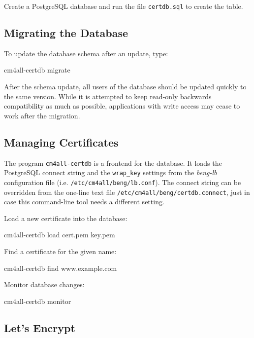 \documentclass[a4paper,12pt]{article}
\begin{document}
Create a PostgreSQL database and run the file \texttt{certdb.sql} to
create the table.

\subsection{Migrating the Database}

To update the database schema after an update, type:

\begin{verbatim*}
cm4all-certdb migrate
\end{verbatim*}

After the schema update, all users of the database should be updated
quickly to the same version.  While it is attempted to keep read-only
backwards compatibility as much as possible, applications with write
access may cease to work after the migration.

\subsection{Managing Certificates}

The program \texttt{cm4all-certdb} is a frontend for the database.  It
loads the PostgreSQL connect string and the \verb|wrap_key| settings
from the \emph{beng-lb} configuration file
(i.e. \texttt{/etc/cm4all/beng/lb.conf}).  The connect string can be
overridden from the one-line text file
\texttt{/etc/cm4all/beng/certdb.connect}, just in case this
command-line tool needs a different setting.

Load a new certificate into the database:

\begin{verbatim*}
cm4all-certdb load cert.pem key.pem
\end{verbatim*}

Find a certificate for the given name:

\begin{verbatim*}
cm4all-certdb find www.example.com
\end{verbatim*}

Monitor database changes:

\begin{verbatim*}
cm4all-certdb monitor
\end{verbatim*}

\subsection{Let's Encrypt}
\end{document}
